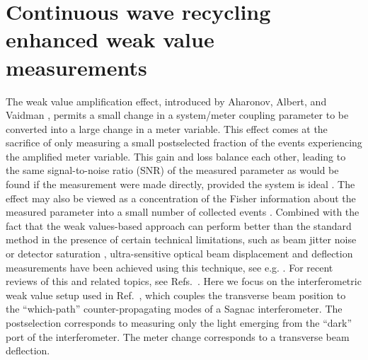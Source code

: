 \chapter{Continuous wave recycling enhanced weak value measurements}
The weak value amplification effect, introduced by Aharonov, Albert, and Vaidman \cite{Aharonov1988}, permits a small change in a system/meter coupling parameter to be converted into a large change in a meter variable.  This effect comes at the sacrifice of only measuring a small postselected fraction of the events experiencing the amplified meter variable.  This gain and loss balance each other, leading to the same signal-to-noise ratio (SNR) of the measured parameter as would be found if the measurement were made directly, provided the system is ideal \cite{Starling2010}.  The effect may also be viewed as a concentration of the Fisher information about the measured parameter into a small number of collected events \cite{Jordan2014,Viza2014,Pang2014}.  Combined with the fact that the weak values-based approach can perform better than the standard method in the presence of certain technical limitations, such as beam jitter noise or detector saturation \cite{Jordan2014,Viza2014}, ultra-sensitive optical beam displacement and deflection measurements have been achieved using this technique, see e.g. \cite{Hosten2008,Dixon2009,Hogan2011}.  For recent reviews of this and related topics, see Refs.~\cite{Kofman2011,Dressel2014}.  Here we focus on the interferometric weak value setup used in Ref.~\cite{Dixon2009}, which couples the transverse beam position to the ``which-path'' counter-propagating modes of a Sagnac interferometer.  The postselection corresponds to measuring only the light emerging from the ``dark'' port of the interferometer.  The meter change corresponds to a transverse beam deflection.

